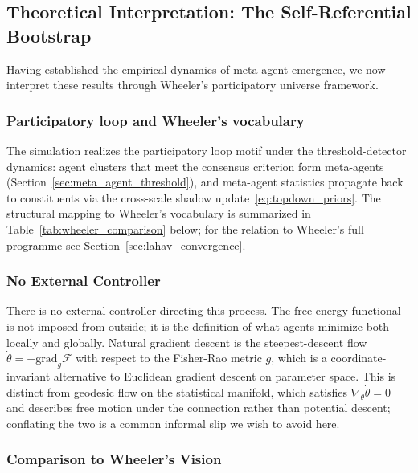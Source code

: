 \documentclass[11pt]{article}
\begin{document}
\subsection{Theoretical Interpretation: The Self-Referential Bootstrap}

Having established the empirical dynamics of meta-agent emergence, we now interpret these results through Wheeler's participatory universe framework.

\subsubsection{Participatory loop and Wheeler's vocabulary}

The simulation realizes the participatory loop motif under the threshold-detector dynamics: agent clusters that meet the consensus criterion form meta-agents (Section~\ref{sec:meta_agent_threshold}), and meta-agent statistics propagate back to constituents via the cross-scale shadow update~\eqref{eq:topdown_priors}. The structural mapping to Wheeler's vocabulary is summarized in Table~\ref{tab:wheeler_comparison} below; for the relation to Wheeler's full programme see Section~\ref{sec:lahav_convergence}.

\subsubsection{No External Controller}

There is no external controller directing this process. The free energy functional is not imposed from outside; it is the definition of what agents minimize both locally and globally. Natural gradient descent is the steepest-descent flow $\dot\theta = -\mathrm{grad}_g \mathcal{F}$ with respect to the Fisher-Rao metric $g$, which is a coordinate-invariant alternative to Euclidean gradient descent on parameter space. This is distinct from geodesic flow on the statistical manifold, which satisfies $\nabla_{\dot\theta}\dot\theta = 0$ and describes free motion under the connection rather than potential descent; conflating the two is a common informal slip we wish to avoid here.

\subsubsection{Comparison to Wheeler's Vision}
\end{document}
